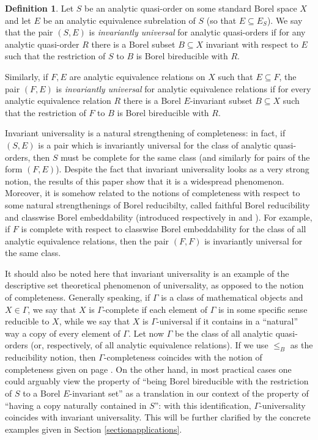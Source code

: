 \documentclass{amsart}
\theoremstyle{definition}
\newtheorem{defin}[theorem]{Definition}
\theoremstyle{remark}
\begin{document}
\begin{defin}
Let $S$ be an analytic quasi-order on some standard Borel space $X$
and let $E$ be an analytic equivalence subrelation of $S$ (so that $E\subseteq E_S$).
We say that the pair $(S,E)$ is \emph{invariantly universal} for
analytic quasi-orders if
for any analytic quasi-order $R$ there is a Borel subset $B \subseteq
X$ invariant with respect to $E$ such that the restriction of $S$ to
$B$ is Borel bireducible with $R$.

Similarly, if $F,E$ are analytic equivalence relations on $X$ such
that $E\subseteq F$, the pair $(F,E)$ is \emph{invariantly universal}
for analytic equivalence relations if for every analytic equivalence
relation $R$ there is a Borel $E$-invariant subset $B\subseteq X$ such
that the restriction of $F$ to $B$ is Borel bireducible with $R$.
\end{defin}

Invariant universality is a natural strengthening of completeness: in fact, if $(S,E)$ is a pair which is invariantly universal for the class of analytic quasi-orders, then $S$ must be complete for the same class (and similarly for pairs of the form $(F,E)$). Despite the fact that invariant universality looks as a very strong notion, the results of this paper show that it is a widespread phenomenon. Moreover, it is somehow related to the notions of completeness with respect to some natural strengthenings of Borel reducibilty, called faithful Borel reducibility and classwise Borel embeddability (introduced respectively in \cite{frista1989} and \cite{mottoros}). For example, if $F$ is complete with respect to classwise Borel embeddability for the class of all analytic equivalence relations, then the pair $(F,F)$ is invariantly universal for the same class.

It should also be noted here that invariant universality is an example of
 the descriptive set theoretical phenomenon of universality, as
 opposed to the notion of completeness. Generally speaking, if
 $\Gamma$ is a class of mathematical objects and $X \in \Gamma$, we
 say that $X$ is $\Gamma$-complete if each element of
 $\Gamma$ is in some specific sense reducible to $X$, while we say
 that $X$ is $\Gamma$-universal if it contains in a
 ``natural'' way a copy of every element of $\Gamma$. Let now
 $\Gamma$ be the class of all analytic quasi-orders (or,
 respectively, of all analytic equivalence relations). If we use
 $\leq_B$ as the reducibility notion, then $\Gamma$-completeness coincides with the
 notion of completeness given on page \pageref{completeness}. On the other hand,
in most practical cases one could arguably view the property of ``being Borel
bireducible with the restriction of $S$ to a Borel $E$-invariant set'' as a
translation in our context of the property of ``having a copy naturally contained
in $S$'': with this identification, $\Gamma$-universality coincides
with invariant universality. This will be further clarified by the concrete examples given in Section \ref{sectionapplications}.
\end{document}
